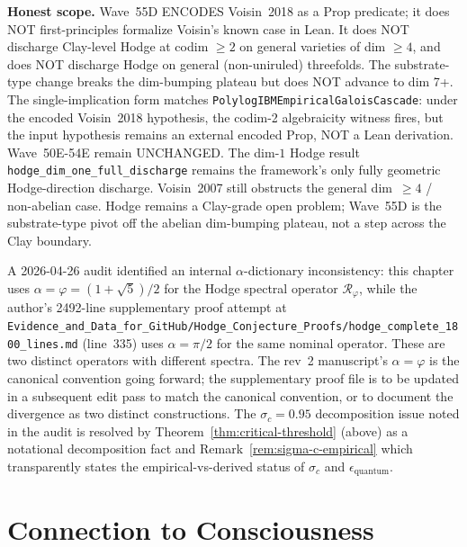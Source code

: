 \begin{remark}
\textbf{Honest scope.} Wave~55D ENCODES Voisin~2018 as a Prop predicate; it does NOT first-principles formalize Voisin's known case in Lean. It does NOT discharge Clay-level Hodge at codim $\geq 2$ on general varieties of dim $\geq 4$, and does NOT discharge Hodge on general (non-uniruled) threefolds. The substrate-type change breaks the dim-bumping plateau but does NOT advance to dim 7+. The single-implication form matches \texttt{PolylogIBMEmpiricalGaloisCascade}: under the encoded Voisin~2018 hypothesis, the codim-2 algebraicity witness fires, but the input hypothesis remains an external encoded Prop, NOT a Lean derivation. Wave~50E-54E remain UNCHANGED. The dim-$1$ Hodge result \texttt{hodge\_dim\_one\_full\_discharge} remains the framework's only fully geometric Hodge-direction discharge. Voisin~2007 still obstructs the general dim~$\geq 4$ / non-abelian case. Hodge remains a Clay-grade open problem; Wave~55D is the substrate-type pivot off the abelian dim-bumping plateau, not a step across the Clay boundary.
\end{remark}

\begin{remark}\label{rem:alpha-dictionary-status}
A 2026-04-26 audit identified an internal $\alpha$-dictionary inconsistency: this chapter uses $\alpha = \varphi = (1+\sqrt{5})/2$ for the Hodge spectral operator $\mathcal{R}_\varphi$, while the author's 2492-line supplementary proof attempt at \texttt{Evidence\_and\_Data\_for\_GitHub/Hodge\_Conjecture\_Proofs/hodge\_complete\_1800\_lines.md} (line~335) uses $\alpha = \pi/2$ for the same nominal operator. These are two distinct operators with different spectra. The rev~2 manuscript's $\alpha = \varphi$ is the canonical convention going forward; the supplementary proof file is to be updated in a subsequent edit pass to match the canonical convention, or to document the divergence as two distinct constructions. The $\sigma_c = 0.95$ decomposition issue noted in the audit is resolved by Theorem~\ref{thm:critical-threshold} (above) as a notational decomposition fact and Remark~\ref{rem:sigma-c-empirical} which transparently states the empirical-vs-derived status of $\sigma_c$ and $\epsilon_{\mathrm{quantum}}$.
\end{remark}

\section{Connection to Consciousness}

